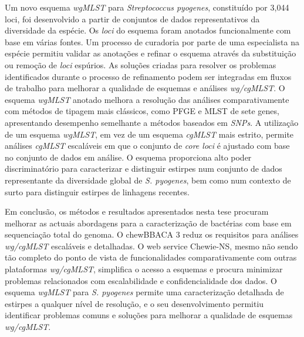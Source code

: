 Um novo esquema \textit{wgMLST} para \textit{Streptococcus pyogenes}, constituído por 3,044 loci, foi desenvolvido a partir de conjuntos de dados representativos da diversidade da espécie. Os \textit{loci} do esquema foram anotados funcionalmente com base em várias fontes. Um processo de curadoria por parte de uma especialista na espécie permitiu validar as anotações e refinar o esquema através da substituição ou remoção de \textit{loci} espúrios. As soluções criadas para resolver os problemas identificados durante o processo de refinamento podem ser integradas em fluxos de trabalho para melhorar a qualidade de esquemas e análises \textit{wg/cgMLST}. O esquema \textit{wgMLST} anotado melhora a resolução das análises comparativamente com métodos de tipagem mais clássicos, como PFGE e MLST de sete genes, apresentando desempenho semelhante a métodos baseados em \textit{SNPs}. A utilização de um esquema \textit{wgMLST}, em vez de um esquema \textit{cgMLST} mais estrito, permite análises \textit{cgMLST} escaláveis em que o conjunto de \textit{core loci} é ajustado com base no conjunto de dados em análise. O esquema proporciona alto poder discriminatório para caracterizar e distinguir estirpes num conjunto de dados representante da diversidade global de \textit{S. pyogenes}, bem como num contexto de surto para distinguir estirpes de linhagens recentes.

Em conclusão, os métodos e resultados apresentados nesta tese procuram melhorar as actuais abordagens para a caracterização de bactérias com base em sequenciação total do genoma. O chewBBACA 3 reduz os requisitos para análises \textit{wg/cgMLST} escaláveis e detalhadas. O web service Chewie-NS, mesmo não sendo tão completo do ponto de vista de funcionalidades comparativamente com outras plataformas \textit{wg/cgMLST}, simplifica o acesso a esquemas e procura minimizar problemas relacionados com escalabilidade e confidencialidade dos dados. O esquema \textit{wgMLST} para \textit{S. pyogenes} permite uma caracterização detalhada de estirpes a qualquer nível de resolução, e o seu desenvolvimento permitiu identificar problemas comuns e soluções para melhorar a qualidade de esquemas \textit{wg/cgMLST}.
